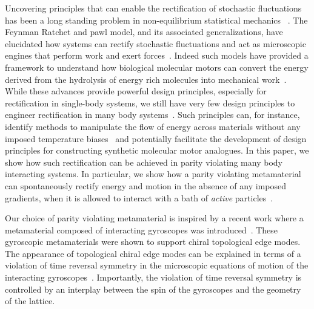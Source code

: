 \documentclass[
 preprint,
 preprintnumbers,
 amsmath,amssymb,
 aps,
 pre,
 longbibliography,
 superscriptaddress,
 10pt, twocolumn
]{revtex4-1}
\begin{document}
Uncovering principles that can enable the rectification of stochastic fluctuations has been a long standing problem in non-equilibrium statistical mechanics ~\cite{Seifert2012StochasticThermodynamics,Coskun2011GreatExpectations}. The Feynman Ratchet and pawl model, and its associated generalizations, have elucidated how systems can rectify stochastic fluctuations and act as microscopic engines that perform work and exert forces~\cite{Jarzynski1999FeynmanRatchet}. Indeed such models have provided a framework to understand how biological molecular motors can convert the energy derived from the hydrolysis of energy rich molecules into mechanical work~\cite{Mogilner1996CellMotility,Chernyak2008PumpingRestriction,Rahav2008DirectedFlow,Sinitsyn2007UniversalGeometric}. While these advances provide powerful design principles, especially for rectification in single-body systems, we still have very few design principles to engineer rectification in many body systems~\cite{Seifert2012StochasticThermodynamics,Pietzonka2019AutonomousEngines}. Such principles can, for instance, identify methods to manipulate the flow of energy across materials without any imposed temperature biases~\cite{Zhu2016PersistentDirectional,Zhu2018TheoryManybody,Dubi2011ColloquiumHeat,Kanazawa2013HeatConduction,Martinez2017ColloidalHeat} and potentially facilitate the development of design principles for constructing synthetic molecular motor analogues. In this paper, we show how such rectification can be achieved in parity violating many body interacting systems. In particular, we show how a parity violating metamaterial~\cite{Nash2015TopologicalMechanics} can spontaneously rectify energy and motion in the absence of any imposed gradients, when it is allowed to interact with a bath of \textit{active} particles~\cite{Marchetti2013HydrodynamicsSoft,Koumakis2013TargetedDelivery,Woodhouse2018AutonomousActuation}. 

Our choice of parity violating metamaterial is inspired by a recent work where a metamaterial composed of interacting gyroscopes was introduced~\cite{Nash2015TopologicalMechanics}. These gyroscopic metamaterials were shown to support chiral topological edge modes. The appearance of topological chiral edge modes can be explained in terms of a violation of time reversal symmetry in the microscopic equations of motion of the interacting gyroscopes~\cite{Nash2015TopologicalMechanics,Mitchell2018AmorphousTopological}. Importantly, the violation of time reversal symmetry is controlled by an interplay between the spin of the gyroscopes and the geometry of the lattice. 
\end{document}
